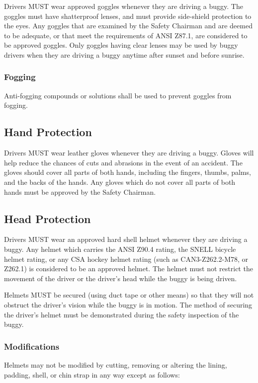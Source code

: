 Drivers MUST wear approved goggles whenever they are driving a buggy. The goggles must have shatterproof lenses, and must provide side-shield protection to the eyes. Any goggles that are examined by the Safety Chairman and are deemed to be adequate, or that meet the requirements of ANSI Z87.1, are considered to be approved goggles. Only goggles having clear lenses may be used by buggy drivers when they are driving a buggy anytime after sunset and before sunrise.

\subsubsection{Fogging}
Anti-fogging compounds or solutions shall be used to prevent goggles from fogging.

\subsection{Hand Protection}

Drivers MUST wear leather gloves whenever they are driving a buggy. Gloves will help reduce the chances of cuts and abrasions in the event of an accident. The gloves should cover all parts of both hands, including the fingers, thumbs, palms, and the backs of the hands. Any gloves which do not cover all parts of both hands must be approved by the Safety Chairman.

\subsection{Head Protection}

Drivers MUST wear an approved hard shell helmet whenever they are driving a buggy. Any helmet which carries the ANSI Z90.4 rating, the SNELL bicycle helmet rating, or any CSA hockey helmet rating (such as CAN3-Z262.2-M78, or Z262.1) is considered to be an approved helmet. The helmet must not restrict the movement of the driver or the driver's head while the buggy is being driven.

Helmets MUST be secured (using duct tape or other means) so that they will not obstruct the driver's vision while the buggy is in motion. The method of securing the driver's helmet must be demonstrated during the safety inspection of the buggy.

\subsubsection{Modifications}
Helmets may not be modified by cutting, removing or altering the lining, padding, shell, or chin strap in any way except as follows:

